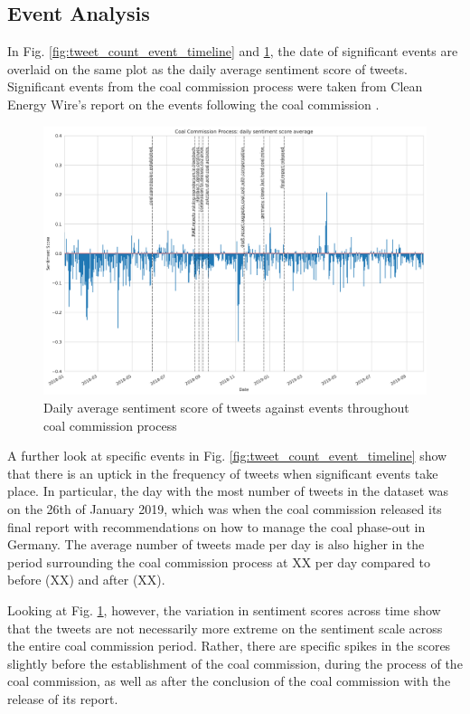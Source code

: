 \documentclass[12pt,onecolumn,twoside]{layout}
\begin{document}
\subsection*{Event Analysis}
In Fig. \ref{fig:tweet_count_event_timeline} and \ref{fig:tweet_score_event_timeline}, the date of significant events are overlaid on the same plot as the daily average sentiment score of tweets. Significant events from the coal commission process were taken from Clean Energy Wire's report on the events following the coal commission \cite{Amelang2019}. 
 
\begin{figure} 
	\begin{center}
		\includegraphics[width=\textwidth]{figures/sa_tweet_score_event_timeline}
	\end{center}
	\caption{Daily average sentiment score of tweets against events throughout coal commission process}
	\label{fig:tweet_score_event_timeline}
\end{figure}

A further look at specific events in Fig. \ref{fig:tweet_count_event_timeline} show that there is an uptick in the frequency of tweets when significant events take place. In particular, the day with the most number of tweets in the dataset was on the 26th of January 2019, which was when the coal commission released its final report with recommendations on how to manage the coal phase-out in Germany. The average number of tweets made per day is also higher in the period surrounding the coal commission process at XX per day compared to before (XX) and after (XX). 

Looking at Fig. \ref{fig:tweet_score_event_timeline}, however, the variation in sentiment scores across time show that the tweets are not necessarily more extreme on the sentiment scale across the entire coal commission period. Rather, there are specific spikes in the scores slightly before the establishment of the coal commission, during the process of the coal commission, as well as after the conclusion of the coal commission with the release of its report. 
\end{document}
